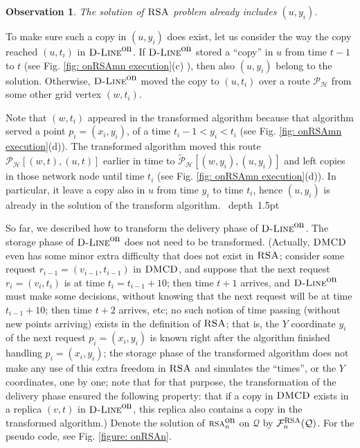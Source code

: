 \documentclass[11pt]{article}
\newtheorem{observation}[theorem]{Observation}
\def\proof{\par\noindent{\bf Proof:~}}
\def\blackslug{\hbox{\hskip 1pt \vrule width 4pt height 8pt
    depth 1.5pt \hskip 1pt}}
\def\QED{\quad\blackslug\lower 8.5pt\null\par}
\newcommand{\DMCD}{\mbox{\sc DMCD}}
\newcommand{\RSA}{\mbox{\sc RSA}}
\newcommand{\calH}{\mathcal{H}}
\newcommand{\calF}{\mathcal{F}}
\newcommand{\calQ}{\mathcal{Q}}
\newcommand{\calP}{\mathcal{P}}
\newcommand{\onRSAn}{\mbox{\sc rsa}^{\mbox{\upshape on}}_{\nn}}
\newcommand{\nn}{n}
\newcommand{\Dlineon}[0]{\mbox{{\sc D-Line}}^{\mbox{\upshape on}}}
\newcommand{\FRSAn}[0]{\calF^{\mbox{\sc rsa}}_{\nn}}
\begin{document}
\begin{observation}
The solution of $\RSA$ problem already includes $(u,y_i)$.
\label{obser:SRSA: (u,y) in the solution}
\end{observation}
\def\AppObserSRSAuyInTheSolution{
\proof
To make sure such a copy in $(u,y_i)$ does exist, let us consider the way the copy reached $(u,t_i)$ in $\Dlineon$.
If $\Dlineon$ stored a ``copy'' in $u$ from time $t-1$ to $t$
(see Fig. \ref{fig: onRSAmn execution}(c)
),
then also $(u,y_i)$ belong to the solution.
Otherwise, $\Dlineon$ moved the copy to $(u,t_i)$ over a route
$\calP_\calH$
from some other grid vertex $(w,t_i)$.

Note that $(w,t_i)$ appeared in the transformed algorithm because that algorithm served a point
${p_i} = ({ x_i}, { y_i})$, of a time
$t_i-1  <   { y_i}  < t_i$
(see Fig. \ref{fig: onRSAmn execution}(d)).
The transformed algorithm moved this route $\calP_\calH [(w,t),(u,t)]$
earlier in time to
$\tilde{\calP}_\calH [(w,{ y_i}),(u, {y_i})]$ and left copies in those network node until time $t_i$ (see Fig. \ref{fig: onRSAmn execution}(d)).
In particular, it leave a copy also in $u$ from time ${y_i}$ to time $t_i$, hence $(u,y_i)$ is already in the solution of the transform algorithm.
\QED
} \AppObserSRSAuyInTheSolution



So far, we described how to transform the delivery phase of $\Dlineon$. The storage phase of $\Dlineon$ does not need to be transformed.
(Actually, $\DMCD$ even has some minor extra difficulty that does not exist in $\RSA$;
consider some request $r_{i-1}=(v_{i-1},t_{i-1})$ in $\DMCD$, and suppose that the
next request $r_{i}=(v_{i},t_{i})$ is at time $t_{i}=t_{i-1}+10$; then time $t+1$ arrives, and $\Dlineon$ must make some decisions, without knowing that the next request will be at time $t_{i-1}+10$; then time $t+2$ arrives, etc; no such notion of time passing (without new points arriving) exists in the definition of $\RSA$; that is, the $Y$ coordinate $y_{i}$ of the next request $p_{i}=(x_{i},y_{i})$ is known right after the algorithm finished handling $p_i=(x_i,y_i)$; the storage phase of the transformed algorithm does not make any use of this extra freedom in $\RSA$
and simulates the ``times'', or the $Y$ coordinates, one by one; note that for that purpose, the transformation of the delivery phase ensured the following property: that if a copy in
$\DMCD$ exists in a replica $(v,t)$ in $\Dlineon$, this replica also contains a copy in the transformed algorithm.)
Denote the solution of $\onRSAn$ on $\calQ$ by $\FRSAn(\calQ)$.
For the pseudo code, see Fig. \ref{figure: onRSAn}.
\end{document}
